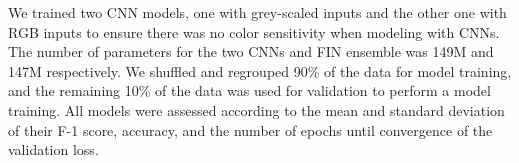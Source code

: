 \documentclass{article}
\begin{document}
We trained two CNN models, one with grey-scaled inputs and the other one with RGB inputs to ensure there was no color sensitivity when modeling with CNNs. The number of parameters for the two CNNs and FIN ensemble was 149M and 147M respectively. We shuffled and regrouped 90\% of the data  for model training, and the remaining 10\% of the data was used for validation to perform a model training. All models were assessed according to the mean and standard deviation of their F-1 score, accuracy, and the number of epochs until convergence of the validation loss. 



\end{document}
